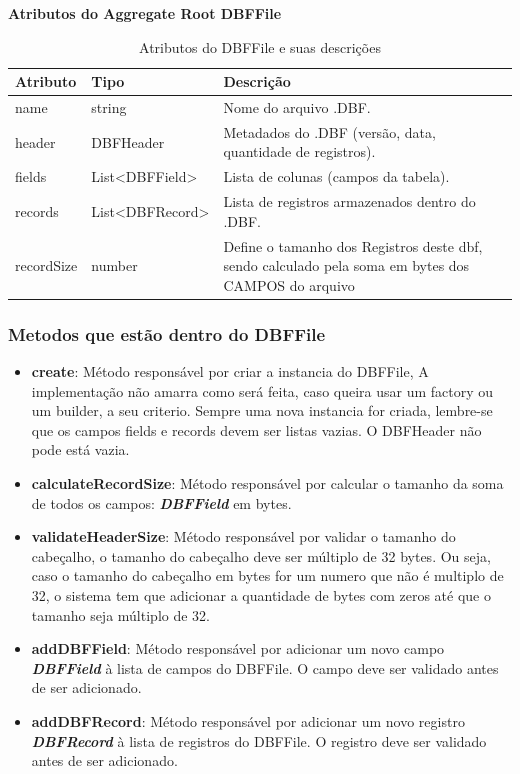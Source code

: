 \begin{table}[H]
    \centering
    \textbf{Atributos do Aggregate Root DBFFile}
    \begin{tabular}{|p{} | p{} | p{}|}
        \hline
        \textbf{Atributo} & \textbf{Tipo} & \textbf{Descrição} \\
        \hline
        name & string & Nome do arquivo .DBF. \\
        \hline
        header & DBFHeader & Metadados do .DBF (versão, data, quantidade de registros). \\
        \hline
        fields & List<DBFField> & Lista de colunas (campos da tabela). \\
        \hline
        records & List<DBFRecord> & Lista de registros armazenados dentro do .DBF. \\
        \hline
        recordSize & number & Define o tamanho dos Registros deste dbf, sendo calculado pela soma em bytes dos CAMPOS do arquivo \\
        \hline
    \end{tabular}
    \caption{Atributos do DBFFile e suas descrições}
    \label{tab:tabela_atributos_dbffile}
\end{table}

\subsubsection{Metodos que estão dentro do DBFFile}
\begin{itemize}
    \item \textbf{create}: Método responsável por criar a instancia do DBFFile, A implementação não amarra como será feita, caso queira usar um factory ou um builder, a seu criterio. Sempre uma nova instancia for criada, lembre-se que os campos fields e records devem ser listas vazias. O DBFHeader não pode está vazia.
    \item \textbf{calculateRecordSize}: Método responsável por calcular o tamanho da soma de todos os campos: \textit{\textbf{DBFField}} em bytes.
    \item \textbf{validateHeaderSize}: Método responsável por validar o tamanho do cabeçalho, o tamanho do cabeçalho deve ser múltiplo de 32 bytes. Ou seja, caso o tamanho do cabeçalho em bytes for um numero que não é multiplo de 32, o sistema tem que adicionar a quantidade de bytes com zeros até que o tamanho seja múltiplo de 32.
    \item \textbf{addDBFField}: Método responsável por adicionar um novo campo \textit{\textbf{DBFField}} à lista de campos do DBFFile. O campo deve ser validado antes de ser adicionado.
    \item \textbf{addDBFRecord}: Método responsável por adicionar um novo registro \textit{\textbf{DBFRecord}} à lista de registros do DBFFile. O registro deve ser validado antes de ser adicionado.
\end{itemize}

